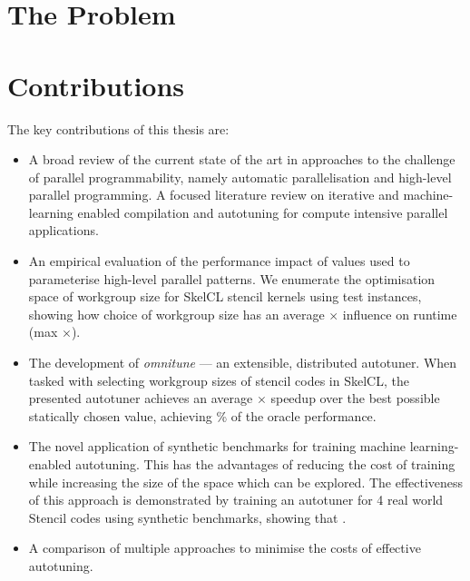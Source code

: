 


\section{The Problem}



\section{Contributions}

The key contributions of this thesis are:

\begin{itemize}
\item A broad review of the current state of the art in approaches to
  the challenge of parallel programmability, namely automatic
  parallelisation and high-level parallel programming. A focused
  literature review on iterative and machine-learning enabled
  compilation and autotuning for compute intensive parallel
  applications.
\item An empirical evaluation of the performance impact of values used
  to parameterise high-level parallel patterns. We enumerate the
  optimisation space of workgroup size for SkelCL stencil kernels
  using  test instances, showing how choice of workgroup
  size has an average $\times$ influence on runtime (max
  $\times$).
\item The development of \emph{omnitune} --- an extensible,
  distributed autotuner. When tasked with selecting workgroup sizes of
  stencil codes in SkelCL, the presented autotuner achieves an average
  $\times$ speedup over the best possible statically chosen
  value, achieving \% of the oracle performance.
\item The novel application of synthetic  benchmarks for training machine learning-enabled
  autotuning. This has the advantages of reducing the cost of training
  while increasing the size of the space which can be explored. The
  effectiveness of this approach is demonstrated by training an
  autotuner for 4 real world Stencil codes using synthetic benchmarks,
  showing that .
\item A comparison of multiple approaches to minimise the costs of
  effective autotuning. 
\end{itemize}

